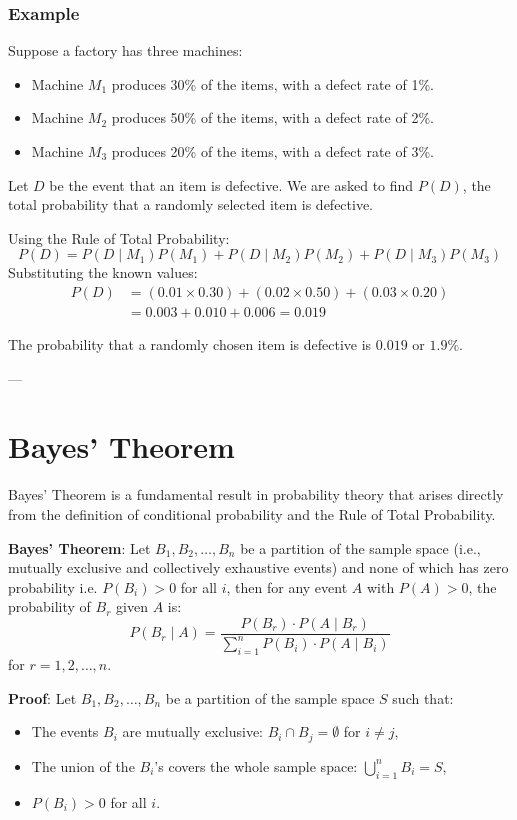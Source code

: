 \documentclass[twoside]{book}
\begin{document}
\subsubsection{Example}

Suppose a factory has three machines:

\begin{itemize}
    \item Machine \( M_1 \) produces 30\% of the items, with a defect rate of 1\%.
    \item Machine \( M_2 \) produces 50\% of the items, with a defect rate of 2\%.
    \item Machine \( M_3 \) produces 20\% of the items, with a defect rate of 3\%.
\end{itemize}

Let \( D \) be the event that an item is defective. We are asked to find \( P(D) \), the total probability that a randomly selected item is defective.

Using the Rule of Total Probability:
\[
P(D) = P(D \mid M_1)P(M_1) + P(D \mid M_2)P(M_2) + P(D \mid M_3)P(M_3)
\]
Substituting the known values:
\begin{align*}
    P(D) &= (0.01 \times 0.30) + (0.02 \times 0.50) + (0.03 \times 0.20) \\
    &= 0.003 + 0.010 + 0.006 = 0.019
\end{align*}

The probability that a randomly chosen item is defective is $0.019$ or $1.9$\%.

---

\section{Bayes' Theorem}
Bayes' Theorem is a fundamental result in probability theory that arises directly from the definition of conditional probability and the Rule of Total Probability.
\begin{textbox}
    \textbf{Bayes' Theorem}: Let \( B_1, B_2, \ldots, B_n \) be a partition of the sample space (i.e., mutually exclusive and collectively exhaustive events) and none of which has zero probability i.e. \( P(B_i) > 0 \) for all \( i \), then for any event \( A \) with \( P(A) > 0 \), the probability of \( B_r \) given \( A \) is:
\[
P(B_r \mid A) = \frac{P(B_r) \cdot P(A \mid B_r)}{\sum_{i=1}^{n} P(B_i) \cdot P(A \mid B_i)}
\]
for \( r = 1, 2, \ldots, n \).
\end{textbox}
\textbf{Proof}: Let \( B_1, B_2, \ldots, B_n \) be a partition of the sample space \( S \) such that:
\begin{itemize}
    \item The events \( B_i \) are mutually exclusive: \( B_i \cap B_j = \emptyset \) for \( i \neq j \),
    \item The union of the \( B_i \)'s covers the whole sample space: \( \bigcup_{i=1}^n B_i = S \),
    \item \( P(B_i) > 0 \) for all \( i \).
\end{itemize}
\end{document}
